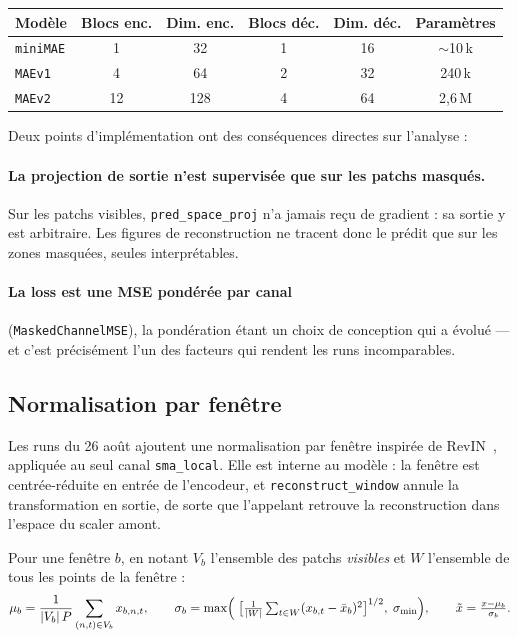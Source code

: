 \documentclass{article}
\begin{document}
\begin{center}
\begin{tabular}{lccccc}
\toprule
Modèle & Blocs enc. & Dim. enc. & Blocs déc. & Dim. déc. & Paramètres \\
\midrule
\texttt{miniMAE} & 1 & 32 & 1 & 16 & $\sim$10\,k \\
\texttt{MAEv1} & 4 & 64 & 2 & 32 & 240\,k \\
\texttt{MAEv2} & 12 & 128 & 4 & 64 & 2,6\,M \\
\bottomrule
\end{tabular}
\end{center}

Deux points d'implémentation ont des conséquences directes sur l'analyse :

\paragraph{La projection de sortie n'est supervisée que sur les patchs masqués.} Sur les patchs visibles, \texttt{pred\_space\_proj} n'a jamais reçu de gradient : sa sortie y est arbitraire. Les figures de reconstruction ne tracent donc le prédit que sur les zones masquées, seules interprétables.

\paragraph{La loss est une MSE pondérée par canal} (\texttt{MaskedChannelMSE}), la pondération étant un choix de conception qui a évolué --- et c'est précisément l'un des facteurs qui rendent les runs incomparables.

\subsection{Normalisation par fenêtre}

Les runs du 26 août ajoutent une normalisation par fenêtre inspirée de RevIN~\cite{kim2022revin}, appliquée au seul canal \texttt{sma\_local}. Elle est interne au modèle : la fenêtre est centrée-réduite en entrée de l'encodeur, et \texttt{reconstruct\_window} annule la transformation en sortie, de sorte que l'appelant retrouve la reconstruction dans l'espace du scaler amont.

Pour une fenêtre $b$, en notant $V_b$ l'ensemble des patchs \emph{visibles} et $W$ l'ensemble de tous les points de la fenêtre :
\begin{equation}
\mu_b = \frac{1}{|V_b|\,P}\sum_{(n,t)\in V_b} x_{b,n,t},
\qquad
\sigma_b = \max\Bigl(\; \bigl[\tfrac{1}{|W|}\textstyle\sum_{t\in W}(x_{b,t}-\bar{x}_b)^2\bigr]^{1/2},\; \sigma_{\min} \Bigr),
\qquad
\tilde{x} = \frac{x-\mu_b}{\sigma_b}.
\end{equation}
\end{document}
